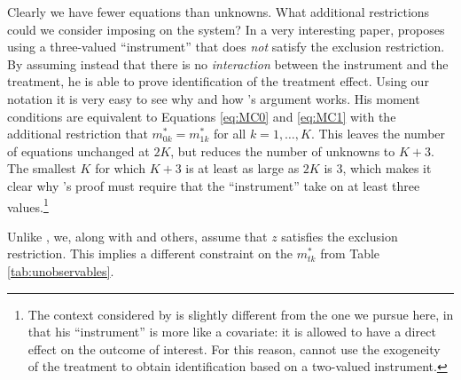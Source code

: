 Clearly we have fewer equations than unknowns.
What additional restrictions could we consider imposing on the system? 
In a very interesting paper, \cite{Lewbel} proposes using a three-valued ``instrument'' that does \emph{not} satisfy the exclusion restriction.
By assuming instead that there is no \emph{interaction} between the instrument and the treatment, he is able to prove identification of the treatment effect.
Using our notation it is very easy to see why and how \citeauthor{Lewbel}'s argument works.
His moment conditions are equivalent to Equations \ref{eq:MC0} and \ref{eq:MC1} with the additional restriction that $m^*_{0k} = m^*_{1k}$ for all $k= 1, \dots, K$.
This leaves the number of equations unchanged at $2K$, but reduces the number of unknowns to $K+3$.
The smallest $K$ for which $K+3$ is at least as large as $2K$ is 3, which makes it clear why \citeauthor{Lewbel}'s proof must require that the ``instrument'' take on at least three values.\footnote{The context considered by \cite{Lewbel} is slightly different from the one we pursue here, in that his ``instrument'' is more like a covariate: it is allowed to have a direct effect on the outcome of interest.  For this reason, \cite{Lewbel} cannot use the exogeneity of the treatment to obtain identification based on a two-valued instrument.}

Unlike \cite{Lewbel}, we, along with \cite{Mahajan} and others, assume that $z$ satisfies the exclusion restriction. 
This implies a different constraint on the $m^*_{tk}$ from Table \ref{tab:unobservables}.


